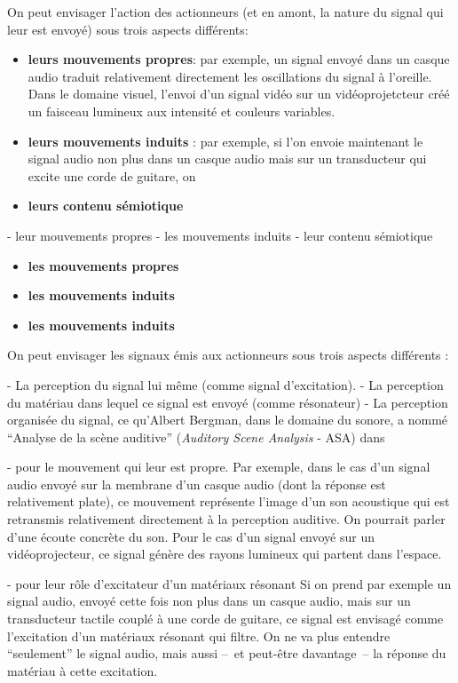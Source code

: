 On peut envisager l'action des actionneurs (et en amont, la nature du signal qui leur est envoyé) sous trois aspects différents:
\vspace{-1em}
\begin{itemize}[noitemsep]
	\item \textbf{leurs mouvements propres}: par exemple, un signal envoyé dans un casque audio traduit relativement directement les oscillations du signal à l'oreille. Dans le domaine visuel, l'envoi d'un signal vidéo sur un vidéoprojetcteur créé un faisceau lumineux aux intensité et couleurs variables.
	\item \textbf{leurs mouvements induits} : par exemple, si l'on envoie maintenant le signal audio non plus dans un casque audio mais sur un transducteur qui excite une corde de guitare, on
	\item \textbf{leurs contenu sémiotique}
\end{itemize}

- leur mouvements propres
- les mouvements induits 
- leur contenu sémiotique


\vspace{-1em}
\begin{itemize}[noitemsep]
	\item \textbf{les mouvements propres}
	\item \textbf{les mouvements induits}
	\item \textbf{les mouvements induits}
\end{itemize}


On peut envisager les signaux émis aux actionneurs sous trois aspects différents :

- La perception du signal lui même (comme signal d'excitation).
- La perception du matériau dans lequel ce signal est envoyé (comme résonateur)
- La perception organisée du signal, ce qu'Albert Bergman, dans le domaine du sonore, a nommé ``Analyse de la scène auditive'' (\textit{Auditory Scene Analysis} - ASA) dans \cite{bregman_auditory_1994}

- pour le mouvement qui leur est propre. Par exemple, dans le cas d'un signal audio envoyé sur la membrane d'un casque audio (dont la réponse est relativement plate), ce mouvement représente l'image d'un son acoustique qui est retransmis relativement directement à la perception auditive. On pourrait parler d'une écoute concrète du son. Pour le cas d'un signal envoyé sur un vidéoprojecteur, ce signal génère des rayons lumineux qui partent dans l'espace.

- pour leur rôle d'excitateur d'un matériaux résonant
Si on prend par exemple un signal audio, envoyé cette fois non plus dans un casque audio, mais sur un transducteur tactile couplé à une corde de guitare, ce signal est envisagé comme l'excitation d'un matériaux résonant qui filtre. On ne va plus entendre ``seulement'' le signal audio, mais aussi --~et peut-être davantage~-- la réponse du matériau à cette excitation.


